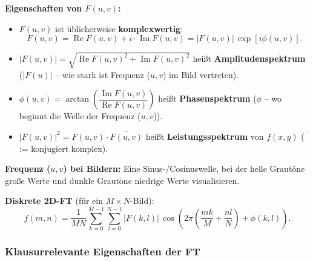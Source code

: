 \documentclass[12pt, a4paper]{article}
\begin{document}
\textbf{Eigenschaften von $F(u,v)$:}
\begin{itemize}
  \item $F(u,v)$ ist üblicherweise \textbf{komplexwertig}:
        \[ F(u,v) = \operatorname{Re}F(u,v) + i\cdot\operatorname{Im}F(u,v)
                  = |F(u,v)|\,\exp[i\phi(u,v)]. \]
  \item $|F(u,v)| = \sqrt{\operatorname{Re}F(u,v)^2 +
        \operatorname{Im}F(u,v)^2}$ \quad heißt \textbf{Amplitudenspektrum}
        ($|F(u)|$ -- wie stark ist Frequenz ($u,v$) im Bild vertreten).
  \item $\phi(u,v) = \arctan\!\left(\dfrac{\operatorname{Im}F(u,v)}
        {\operatorname{Re}F(u,v)}\right)$ \quad heißt \textbf{Phasenspektrum}
        ($\phi$ -- wo beginnt die Welle der Frequenz ($u,v$)).
  \item $|F(u,v)|^2 = F(u,v)\cdot\overline{F(u,v)}$ \quad heißt
        \textbf{Leistungsspektrum} von $f(x,y)$ \quad
        ($\overline{\phantom{F}}$ := konjugiert komplex).
\end{itemize}

\textbf{Frequenz ($u, v$) bei Bildern:} Eine Sinus-/Cosinuswelle, bei der
helle Grautöne große Werte und dunkle Grautöne niedrige Werte
visualisieren.

\textbf{Diskrete 2D-FT} (für ein $M \times N$-Bild):
\[
  f(m,n) = \frac{1}{MN}
  \sum_{k=0}^{M-1}\sum_{l=0}^{N-1}
  |F(k,l)|\,\cos\!\left(2\pi\!\left(\frac{mk}{M}+\frac{nl}{N}\right)
  +\phi(k,l)\right).
\]

\subsubsection{Klausurrelevante Eigenschaften der FT}
\end{document}
